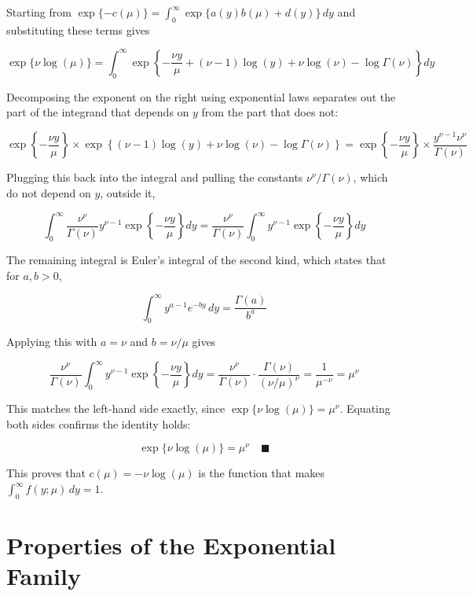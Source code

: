 Starting from $\exp\{-c(\mu)\} = \int_0^\infty \exp\{a(y)b(\mu)+d(y)\}\,dy$ and substituting these terms gives
\begin{mathbox}
\[
\exp\{\nu\log(\mu)\} = \int_0^\infty \exp\left\{-\frac{\nu y}{\mu} + (\nu-1)\log(y) + \nu\log(\nu) - \log\Gamma(\nu)\right\}dy
\]
\end{mathbox}
Decomposing the exponent on the right using exponential laws separates out the part of the integrand that depends on $y$ from the part that does not:
\begin{mathbox}
\[
\exp\left\{-\frac{\nu y}{\mu}\right\} \times \exp\left\{(\nu-1)\log(y)+\nu\log(\nu)-\log\Gamma(\nu)\right\} = \exp\left\{-\frac{\nu y}{\mu}\right\}\times\frac{y^{\nu-1}\nu^\nu}{\Gamma(\nu)}
\]
\end{mathbox}
Plugging this back into the integral and pulling the constants $\nu^\nu/\Gamma(\nu)$, which do not depend on $y$, outside it,
\begin{mathbox}
\[
\int_0^\infty \frac{\nu^\nu}{\Gamma(\nu)}y^{\nu-1}\exp\left\{-\frac{\nu y}{\mu}\right\}dy = \frac{\nu^\nu}{\Gamma(\nu)}\int_0^\infty y^{\nu-1}\exp\left\{-\frac{\nu y}{\mu}\right\}dy
\]
\end{mathbox}
The remaining integral is Euler's integral of the second kind, which states that for $a,b>0$,
\begin{mathbox}
\[
\int_0^\infty y^{a-1}e^{-by}\,dy = \frac{\Gamma(a)}{b^a}
\]
\end{mathbox}
Applying this with $a=\nu$ and $b=\nu/\mu$ gives
\begin{mathbox}
\[
\frac{\nu^\nu}{\Gamma(\nu)}\int_0^\infty y^{\nu-1}\exp\left\{-\frac{\nu y}{\mu}\right\}dy = \frac{\nu^\nu}{\Gamma(\nu)}\cdot\frac{\Gamma(\nu)}{(\nu/\mu)^\nu} = \frac{1}{\mu^{-\nu}} = \mu^\nu
\]
\end{mathbox}
This matches the left-hand side exactly, since $\exp\{\nu\log(\mu)\} = \mu^\nu$. Equating both sides confirms the identity holds:
\begin{mathbox}
\[
\exp\{\nu\log(\mu)\} = \mu^\nu \quad\blacksquare
\]
\end{mathbox}
This proves that $c(\mu) = -\nu\log(\mu)$ is the function that makes $\int_0^\infty f(y;\mu)\,dy = 1$.

\Reflection
\tbc

\Application
\tbc


\chapter{Properties of the Exponential Family}

